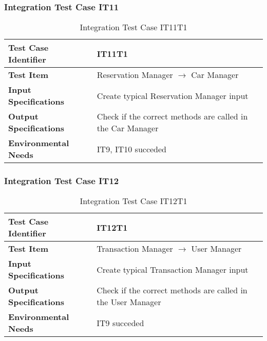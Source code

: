 \subsubsection{Integration Test Case IT11} \label{sssec:IT11}
\vspace{16pt}
\begin{table}[htbp]
\begin{center}
\renewcommand{\arraystretch}{1.5}
\begin{tabular}{l|p{}}
\hline
\textbf{Test Case Identifier} & IT11T1\\
\hline
\textbf{Test Item} & Reservation Manager $\rightarrow$ Car Manager\\
\hline
\textbf{Input Specifications} & Create typical Reservation Manager input \\
\hline
\textbf{Output Specifications} & Check if the correct methods are called in the Car Manager \\
\hline
\textbf{Environmental Needs} & IT9, IT10 succeded\\
\hline
\end{tabular}
\caption{Integration Test Case IT11T1}
\end{center}
\end{table}

\vspace{10pt}
\subsubsection{Integration Test Case IT12} \label{sssec:IT12}
\vspace{16pt}
\begin{table}[htbp]
\begin{center}
\renewcommand{\arraystretch}{1.5}
\begin{tabular}{l|p{}}
\hline
\textbf{Test Case Identifier} & IT12T1\\
\hline
\textbf{Test Item} & Transaction Manager $\rightarrow$ User Manager\\
\hline
\textbf{Input Specifications} & Create typical Transaction Manager input \\
\hline
\textbf{Output Specifications} & Check if the correct methods are called in the User Manager \\
\hline
\textbf{Environmental Needs} & IT9 succeded\\
\hline
\end{tabular}
\caption{Integration Test Case IT12T1}
\end{center}
\end{table}
\clearpage

